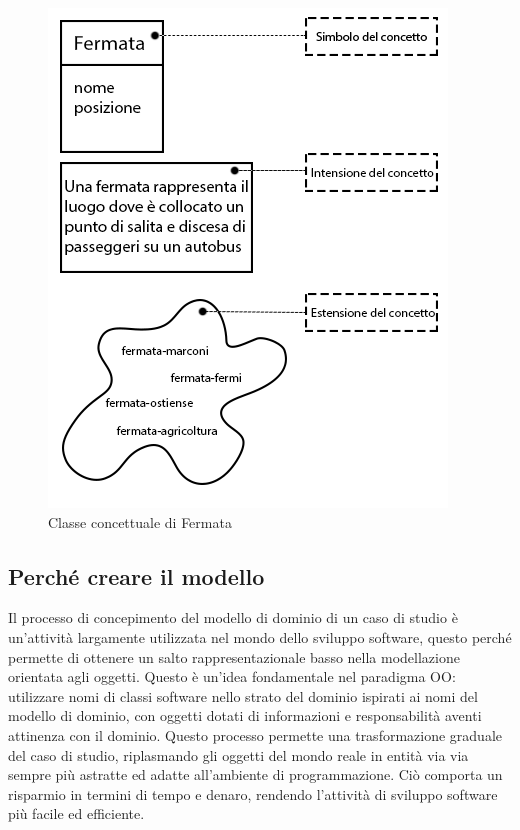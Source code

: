 \begin{figure}[htbp]
\begin{center}
\includegraphics{contents/images/esempio_fermata}
\end{center}
\caption{Classe concettuale di Fermata}
\label{fig:fermata}
\end{figure}

\newpage

\subsection{Perché creare il modello} %
\label{sub:perch_creare_il_modello}

Il processo di concepimento del modello di dominio  di un caso di studio è un’attività largamente utilizzata nel mondo dello sviluppo software, questo perché permette di ottenere un salto rappresentazionale basso nella modellazione orientata agli oggetti.
Questo è un’idea fondamentale nel paradigma OO: utilizzare nomi di classi software nello strato del dominio ispirati ai nomi del modello di dominio, con oggetti dotati di informazioni e responsabilità aventi attinenza con il dominio.
Questo processo permette una trasformazione graduale del caso di studio, riplasmando gli oggetti del mondo reale in entità via via sempre più astratte ed adatte all’ambiente di programmazione.
Ciò comporta un risparmio in termini di tempo e denaro, rendendo l’attività di sviluppo software più facile ed efficiente.

